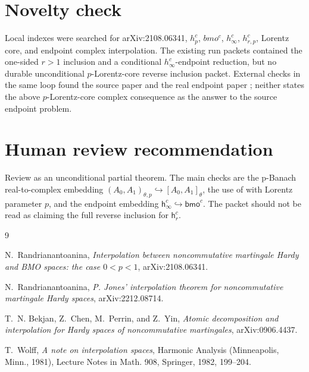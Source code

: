 \documentclass[11pt]{article}
\newcommand{\h}{\mathsf h}
\newcommand{\bmo}{\mathsf{bmo}}
\begin{document}
\section*{Novelty check}

Local indexes were searched for arXiv:2108.06341, \(h_p^c\), \(bmo^c\),
\(h_\infty^c\), \(h_{r,p}^c\), Lorentz core, and endpoint complex
interpolation. The existing run packets contained the one-sided \(r>1\)
inclusion and a conditional \(h_\infty^c\)-endpoint reduction, but no durable
unconditional \(p\)-Lorentz-core reverse inclusion packet. External checks in the
same loop found the source paper \cite{Ran2021} and the real endpoint paper
\cite{Ran2022}; neither states the above \(p\)-Lorentz-core complex consequence as
the answer to the source endpoint problem.

\section*{Human review recommendation}

Review as an unconditional partial theorem. The main checks are the
p-Banach real-to-complex embedding
\((A_0,A_1)_{\theta,p}\hookrightarrow[A_0,A_1]_\theta\), the use of
\cite{Ran2022} with Lorentz parameter \(p\), and the endpoint embedding
\(\h_\infty^c\hookrightarrow\bmo^c\). The packet should not be read as claiming
the full reverse inclusion for \(\h_r^c\).

\begin{thebibliography}{9}

N.~Randrianantoanina,
\emph{Interpolation between noncommutative martingale Hardy and BMO spaces:
the case \(0<p<1\)},
arXiv:2108.06341.

N.~Randrianantoanina,
\emph{P. Jones' interpolation theorem for noncommutative martingale Hardy
spaces},
arXiv:2212.08714.

T.~N. Bekjan, Z.~Chen, M.~Perrin, and Z.~Yin,
\emph{Atomic decomposition and interpolation for Hardy spaces of
noncommutative martingales},
arXiv:0906.4437.

T.~Wolff,
\emph{A note on interpolation spaces},
Harmonic Analysis (Minneapolis, Minn., 1981), Lecture Notes in Math. 908,
Springer, 1982, 199--204.

\end{thebibliography}
\end{document}
